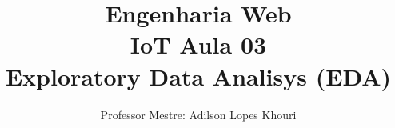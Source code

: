 \documentclass[compress, hyperref={pdfpagelayout=SinglePage}]{beamer}
\title[IoT - Aula 03]{Engenharia Web \\ IoT Aula 03 \\ Exploratory Data Analisys (EDA)}
\author{Professor Mestre: Adilson Lopes Khouri}
\begin{document}
	\begin{frame}
		\titlepage
	\end{frame}
	
	
	
	
	
		
				
	

	
	
\end{document}
